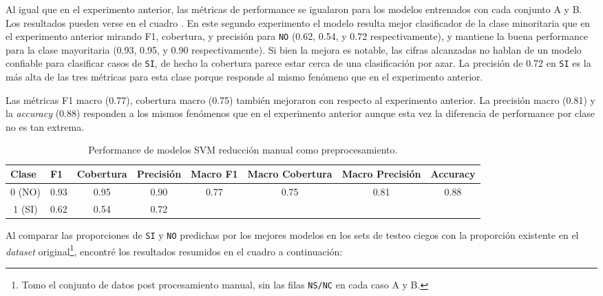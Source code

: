 \documentclass[10 pt]{article}
\begin{document}
Al igual que en el experimento anterior, las métricas de performance se igualaron para los modelos entrenados con cada conjunto A y B. Los resultados pueden verse en el cuadro . En este segundo experimento el modelo resulta mejor clasificador de la clase minoritaria que en el experimento anterior mirando F1, cobertura, y precisión para \texttt{NO} (0.62, 0.54, y 0.72 respectivamente), y mantiene la buena performance para la clase mayoritaria (0.93, 0.95, y 0.90 respectivamente). Si bien la mejora es notable, las cifras alcanzadas no hablan de un modelo confiable para clasificar casos de \texttt{SI}, de hecho la cobertura parece estar cerca de una clasificación por azar. La precisión de 0.72 en \texttt{SI} es la más alta de las tres métricas para esta clase porque responde al mismo fenómeno que en el experimento anterior.


Las métricas F1 macro (0.77), cobertura macro (0.75) también mejoraron con respecto al experimento anterior. La precisión macro (0.81) y la \textit{accuracy} (0.88) responden a los mismos fenómenos que en el experimento anterior aunque esta vez la diferencia de performance por clase no es tan extrema.

\begin{table}[H]
    \centering
    \small
    \caption{Performance de modelos SVM reducción manual como preprocesamiento.}
    \label{svmperfomanual}
    \begin{tabular}{cccccccc}
    \hline
    \multicolumn{1}{l}{\textbf{Clase}} & \multicolumn{1}{l}{\textbf{F1}} & \multicolumn{1}{l}{\textbf{Cobertura}} & \multicolumn{1}{l}{\textbf{Precisión}} & \multicolumn{1}{l}{\textbf{Macro F1}} & \multicolumn{1}{l}{\textbf{Macro Cobertura}} & \multicolumn{1}{l}{\textbf{Macro Precisión}} & \multicolumn{1}{l}{\textbf{Accuracy}} \\ \hline
    0 (NO) & 0.93 & 0.95 & 0.90 & \multirow{2}{*}{0.77} & \multirow{2}{*}{0.75} & \multirow{2}{*}{0.81} & \multirow{2}{*}{0.88} \\
    1 (SI) & 0.62 & 0.54 & 0.72 &  &  &  &  \\ \hline
    \end{tabular}
    \end{table}


Al comparar las proporciones de \texttt{SI} y \texttt{NO} predichas por los mejores modelos en los sets de testeo ciegos con la proporción existente en el \textit{dataset} original\footnote{Tomo el conjunto de datos post procesamiento manual, sin las filas \texttt{NS/NC} en cada caso A y B.}, encontré los resultados resumidos en el cuadro a continuación:
\end{document}
